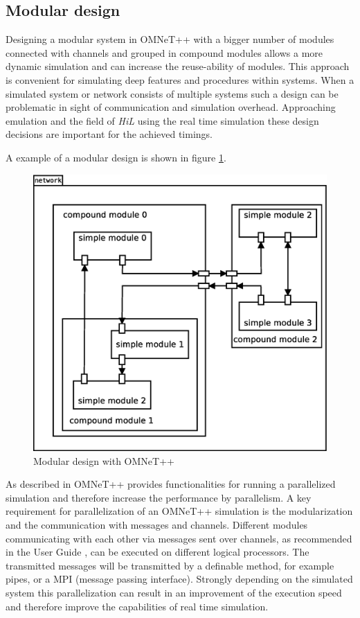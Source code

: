 \documentclass[journal]{IEEEtran}
\begin{document}
\subsection{Modular design}
Designing a modular system in OMNeT++ with a bigger number of modules connected with channels and grouped in compound modules allows a more dynamic simulation and can increase the reuse-ability of modules.
This approach is convenient for simulating deep features and procedures within systems.
When a simulated system or network consists of multiple systems such a design can be problematic in sight of communication and simulation overhead.
Approaching emulation and the field of \emph{HiL} using the real time simulation these design decisions are important for the achieved timings.

A example of a modular design is shown in figure \ref{fig:OMNeTModularDesign}.

\begin{figure}
    \centering
    \includegraphics[width=0.9\columnwidth]{OMNeTModularDesign.eps}
    \caption{Modular design with OMNeT++}
    \label{fig:OMNeTModularDesign}
\end{figure}

As described in \cite[2.8]{varga_overview_2008} OMNeT++ provides functionalities for running a parallelized simulation and therefore increase the performance by parallelism.
A key requirement for parallelization of an OMNeT++ simulation is the modularization and the communication with messages and channels.
Different modules communicating with each other via messages sent over channels, as recommended in the User Guide \cite{OMNETMANUAL}, can be executed on different logical processors.
The transmitted messages will be transmitted by a definable method, for example pipes, or a MPI (message passing interface).
Strongly depending on the simulated system this parallelization can result in an improvement of the execution speed and therefore improve the capabilities of real time simulation.
\end{document}
